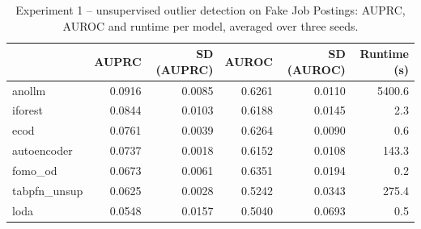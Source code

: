 \begin{table}
\centering
\caption{Experiment 1 -- unsupervised outlier detection on Fake Job Postings: AUPRC, AUROC and runtime per model, averaged over three seeds.}
\label{tab:exp1_fake_jobs}
\begin{tabular}{lrrrrr}
\toprule
 & \bfseries AUPRC & \bfseries SD (AUPRC) & \bfseries AUROC & \bfseries SD (AUROC) & \bfseries Runtime (s) \\
\midrule
anollm & 0.0916 & 0.0085 & 0.6261 & 0.0110 & 5400.6 \\
iforest & 0.0844 & 0.0103 & 0.6188 & 0.0145 & 2.3 \\
ecod & 0.0761 & 0.0039 & 0.6264 & 0.0090 & 0.6 \\
autoencoder & 0.0737 & 0.0018 & 0.6152 & 0.0108 & 143.3 \\
fomo\_od & 0.0673 & 0.0061 & 0.6351 & 0.0194 & 0.2 \\
tabpfn\_unsup & 0.0625 & 0.0028 & 0.5242 & 0.0343 & 275.4 \\
loda & 0.0548 & 0.0157 & 0.5040 & 0.0693 & 0.5 \\
\bottomrule
\end{tabular}
\end{table}
